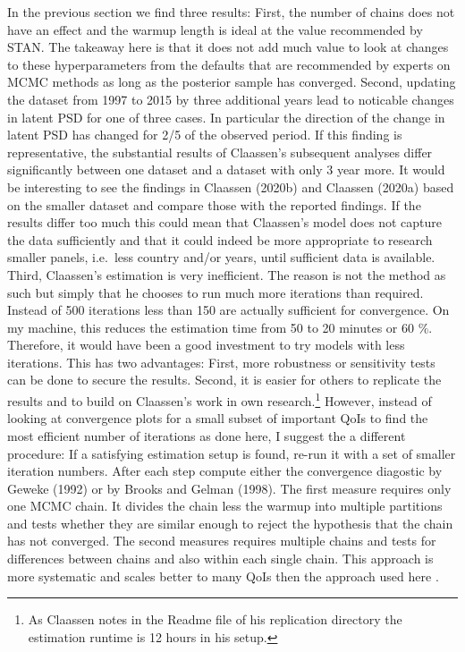 \documentclass[12pt,english,a4paper,oneside]{article}
\theoremstyle{definition}
\theoremstyle{definition}
\theoremstyle{definition}
\theoremstyle{definition}
\theoremstyle{remark}
\begin{document}
In the previous section we find three results: First, the number of chains does not have an effect and the warmup length is ideal at the value recommended by STAN. The takeaway here is that it does not add much value to look at changes to these hyperparameters from the defaults that are recommended by experts on MCMC methods as long as the posterior sample has converged. Second, updating the dataset from 1997 to 2015 by three additional years lead to noticable changes in latent PSD for one of three cases. In particular the direction of the change in latent PSD has changed for 2/5 of the observed period. If this finding is representative, the substantial results of Claassen's subsequent analyses differ significantly between one dataset and a dataset with only 3 year more. It would be interesting to see the findings in Claassen (2020b) and Claassen (2020a) based on the smaller dataset and compare those with the reported findings. If the results differ too much this could mean that Claassen's model does not capture the data sufficiently and that it could indeed be more appropriate to research smaller panels, i.e.~less country and/or years, until sufficient data is available. Third, Claassen's estimation is very inefficient. The reason is not the method as such but simply that he chooses to run much more iterations than required. Instead of 500 iterations less than 150 are actually sufficient for convergence. On my machine, this reduces the estimation time from 50 to 20 minutes or 60 \(\%\). Therefore, it would have been a good investment to try models with less iterations. This has two advantages: First, more robustness or sensitivity tests can be done to secure the results. Second, it is easier for others to replicate the results and to build on Claassen's work in own research.\footnote{As Claassen notes in the Readme file of his replication directory the estimation runtime is 12 hours in his setup.} However, instead of looking at convergence plots for a small subset of important QoIs to find the most efficient number of iterations as done here, I suggest the a different procedure: If a satisfying estimation setup is found, re-run it with a set of smaller iteration numbers. After each step compute either the convergence diagostic by Geweke (1992) or by Brooks and Gelman (1998). The first measure requires only one MCMC chain. It divides the chain less the warmup into multiple partitions and tests whether they are similar enough to reject the hypothesis that the chain has not converged. The second measures requires multiple chains and tests for differences between chains and also within each single chain. This approach is more systematic and scales better to many QoIs then the approach used here
.
\end{document}
